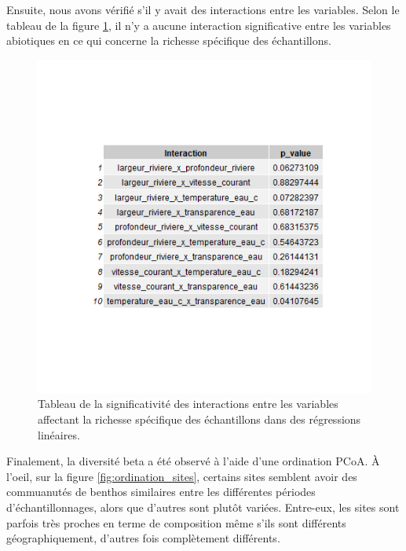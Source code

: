 \documentclass[9pt,twocolumn,twoside,]{pnas-new}
\begin{document}
Ensuite, nous avons vérifié s'il y avait des interactions entre les
variables. Selon le tableau de la figure \ref{fig:tableau_interaction},
il n'y a aucune interaction significative entre les variables abiotiques
en ce qui concerne la richesse spécifique des échantillons.

\begin{figure}
\centering
\includegraphics{tableau_interaction.png}
\caption{Tableau de la significativité des interactions entre les
variables affectant la richesse spécifique des échantillons dans des
régressions linéaires. \label{fig:tableau_interaction}}
\end{figure}

Finalement, la diversité beta a été observé à l'aide d'une ordination
PCoA. À l'oeil, sur la figure \ref{fig:ordination_sites}, certains sites
semblent avoir des commuanutés de benthos similaires entre les
différentes périodes d'échantillonnages, alors que d'autres sont plutôt
variées. Entre-eux, les sites sont parfois très proches en terme de
composition même s'ils sont différents géographiquement, d'autres fois
complètement différents.
\end{document}
